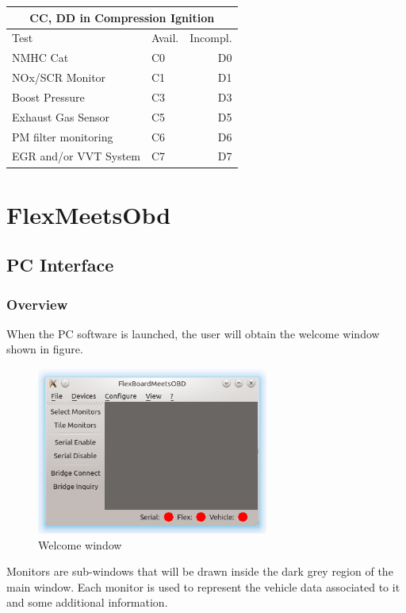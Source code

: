 \documentclass[twoside]{article}
\begin{document}
\begin{multicols}{2}
\begin{table}[H]
\centering
\begin{tabular}{llr}
\multicolumn{3}{c}{CC, DD in Compression Ignition} \\
\toprule
Test & Avail. & Incompl. \\
\midrule
NMHC Cat & C0 & D0 \\
NOx/SCR Monitor & C1 & D1 \\
Boost Pressure & C3 & D3 \\
Exhaust Gas Sensor & C5 & D5 \\
PM filter monitoring & C6 & D6 \\
EGR and/or VVT System & C7 & D7 \\
\bottomrule
\end{tabular}
\end{table}

\section{FlexMeetsObd}

\subsection{PC Interface}

\subsubsection{Overview}

When the PC software is launched, the user will obtain the welcome window shown in figure.

\begin{figure}[H]
  \centering
  \includegraphics[width=3in]{img/GUI/welcome_window}
  \caption{Welcome window}
\end{figure}

Monitors are sub-windows that will be drawn inside the dark grey region of the main window. Each monitor is used to represent the vehicle data associated to it and some additional information.


\end{multicols}
\end{document}
